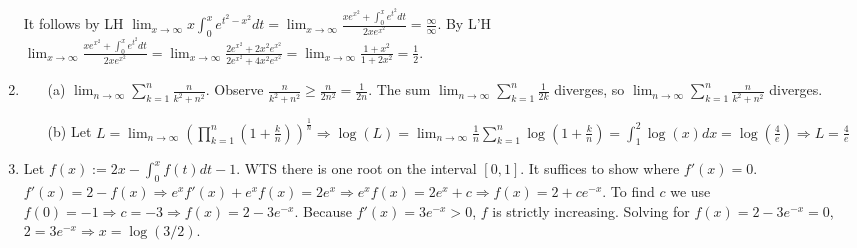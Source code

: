 \documentclass[10pt]{article}
\begin{document}
\begin{enumerate}[label= (Q-\arabic*)]
    It follows by LH $\lim_{x\rightarrow\infty}x\int_{0}^{x}e^{t^2-x^2}dt=\lim_{x\rightarrow\infty}\frac{xe^{x^2}+\int_{0}^{x}e^{t^2}dt}{2xe^{x^2}}=\frac{\infty}{\infty}$. 
    By L'H $\lim_{x\rightarrow\infty}\frac{xe^{x^2}+\int_{0}^{x}e^{t^2}dt}{2xe^{x^2}}=\lim_{x\rightarrow\infty}\frac{2e^{x^2}+2x^2e^{x^2}}{2e^{x^2}+4x^2e^{x^2}}=\lim_{x\rightarrow\infty}\frac{1+x^2}{1+2x^2}=\frac{1}{2}$.
    \item \begin{itemize}
        \item [(a)] $\lim_{n\rightarrow\infty}\sum_{k=1}^{n}\frac{n}{k^2+n^2}$. Observe $\frac{n}{k^2+n^2}\ge\frac{n}{2n^2}=\frac{1}{2n}$. The sum $\lim_{n\rightarrow\infty}\sum_{k=1}^{n}\frac{1}{2k}$ diverges, so $\lim_{n\rightarrow\infty}\sum_{k=1}^{n}\frac{n}{k^2+n^2}$ diverges.
        \item [(b)] Let $L=\lim_{n\rightarrow\infty}{(\prod_{k=1}^{n}(1+\frac{k}{n}))}^\frac{1}{n}\Rightarrow \log(L)=\lim_{n\rightarrow\infty}\frac{1}{n}\sum_{k=1}^{n}\log(1+\frac{k}{n})=\int_{1}^{2}\log(x)dx=\log(\frac{4}{e})\Rightarrow L=\frac{4}{e}$ 
    \end{itemize}
    \item Let $f(x):=2x-\int_{0}^{x}f(t)dt-1$. WTS there is one root on the interval $[0,1]$. 
    It suffices to show where $f'(x)=0$. 
    $f'(x)=2-f(x)\Rightarrow e^x f'(x)+e^x f(x)=2e^x\Rightarrow e^x f(x)=2e^x+c\Rightarrow f(x)=2+ce^{-x}$.
    To find $c$ we use $f(0)=-1\Rightarrow c=-3\Rightarrow f(x)=2-3e^{-x}$. 
    Because $f'(x)=3e^{-x}>0$, $f$ is strictly increasing. Solving for $f(x)=2-3e^{-x}=0$, $2=3e^{-x}\Rightarrow x=\log(3/2)$.
\end{enumerate}
    
\end{document}
